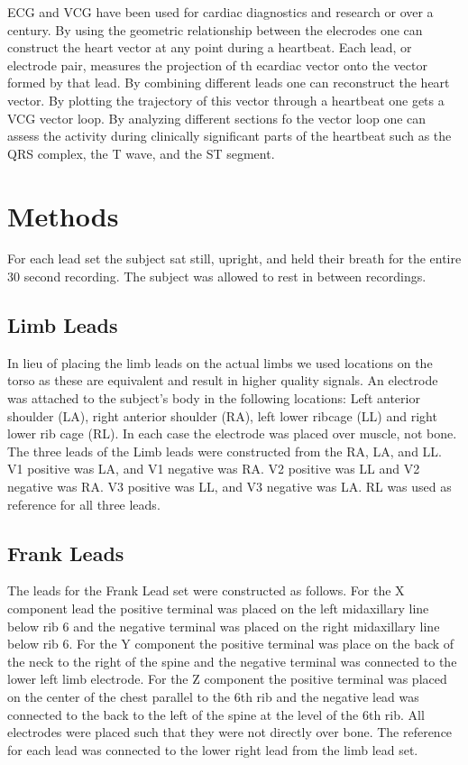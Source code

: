 \documentclass[12pt]{article}
\begin{document}
\par{}
ECG and VCG have been used for cardiac diagnostics and research or over a century. By using the geometric relationship between the elecrodes one can construct the heart vector at any point during a heartbeat. Each lead, or electrode pair, measures the projection of th ecardiac vector onto the vector formed by that lead. By combining different leads one can reconstruct the heart vector. By plotting the trajectory of this vector through a heartbeat one gets a VCG vector loop. By analyzing different sections fo the vector loop one can assess the activity during clinically significant parts of the heartbeat such as the QRS complex, the T wave, and the ST segment.
\par{}
\section{Methods}
\par{}
For each lead set the subject sat still, upright, and held their breath for the entire 30 second recording. The subject was allowed to rest in between recordings. 

\subsection{Limb Leads}
\par{}
In lieu of placing the limb leads on the actual limbs we used locations on the torso as these are equivalent and result in higher quality signals. An electrode was attached to the subject's body in the following locations: Left anterior shoulder (LA), right anterior shoulder (RA), left lower ribcage (LL) and right lower rib cage (RL). In each case the electrode was placed over muscle, not bone. The three leads of the Limb leads were constructed from the RA, LA, and LL. V1 positive was LA, and V1 negative was RA. V2 positive was LL and V2 negative was RA. V3 positive was LL, and V3 negative was LA. RL was used as reference for all three leads. 

\par{}



\subsection{Frank Leads}
\par{}
The leads for the Frank Lead set were constructed as follows. For the X component lead the positive terminal was placed on the left midaxillary line below rib 6 and the negative terminal was placed on the right midaxillary line below rib 6. For the Y component the positive terminal was place on the back of the neck to the right of the spine and the negative terminal was connected to the lower left limb electrode. For the Z component the positive terminal was placed on the center of the chest parallel to the 6th rib and the negative lead was connected to the back to the left of the spine at the level of the 6th rib. All electrodes were placed such that they were not directly over bone. The reference for each lead was connected to the lower right lead from the limb lead set.
\end{document}
